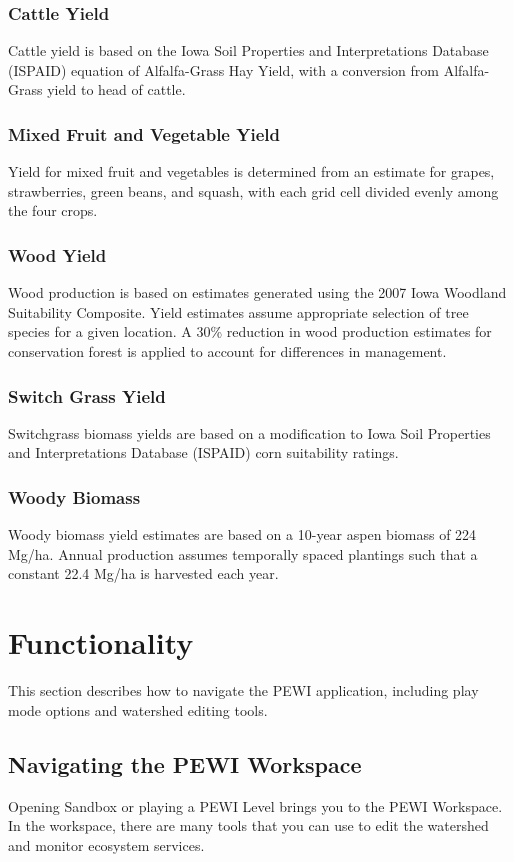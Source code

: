 \documentclass[11pt]{article}
\begin{document}
\subsubsection{Cattle Yield}
Cattle yield is based on the Iowa Soil Properties and Interpretations Database (ISPAID) equation of Alfalfa-Grass Hay Yield, with a conversion from Alfalfa-Grass yield to head of cattle.

\subsubsection{Mixed Fruit and Vegetable Yield}
Yield for mixed fruit and vegetables is determined from an estimate for grapes, strawberries, green beans, and squash, with each grid cell divided evenly among the four crops. 

\subsubsection{Wood Yield}
Wood production is based on estimates generated using the 2007 Iowa Woodland Suitability Composite.\cite{44} Yield estimates assume appropriate selection of tree species for a given location. A 30\% reduction in wood production estimates for conservation forest is applied to account for differences in management.

\subsubsection{Switch Grass Yield}
Switchgrass biomass yields are based on a modification to Iowa Soil Properties and Interpretations Database (ISPAID) corn suitability ratings.\cite{45}

\subsubsection{Woody Biomass}
Woody biomass yield estimates are based on a 10-year aspen biomass of 224 Mg/ha.\cite{46}  Annual production assumes temporally spaced plantings such that a constant 22.4 Mg/ha is harvested each year.

\newpage

\section{Functionality}
This section describes how to navigate the PEWI application, including play mode options and watershed editing tools.

\subsection{Navigating the PEWI Workspace}
Opening Sandbox or playing a PEWI Level brings you to the PEWI Workspace. In the workspace, there are many tools that you can use to edit the watershed and monitor ecosystem services.
\end{document}

